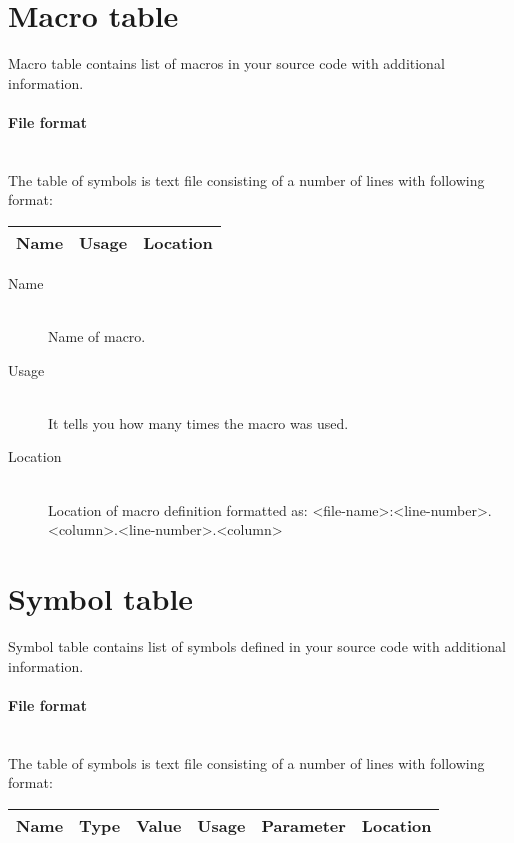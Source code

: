 \clearpage
\section{Macro table}
    Macro table contains list of macros in your source code with additional information.\\

    \paragraph{File format}
        ~\\
        The table of symbols is text file consisting of a number of lines with following format:\\
        \begin{tabular}{|ccc|}
            \hline
            Name & Usage & Location \\
            \hline
        \end{tabular}

    \begin{description}
        \item[Name]~\\
            Name of macro.
        \item[Usage]~\\
            It tells you how many times the macro was used.
        \item[Location]~\\
            Location of macro definition formatted as: <file-name>:<line-number>.<column>.<line-number>.<column>
    \end{description}

\section{Symbol table}
    Symbol table contains list of symbols defined in your source code with additional information.

    \paragraph{File format}
        ~\\
        The table of symbols is text file consisting of a number of lines with following format:\\
        \begin{tabular}{|cccccc|}
            \hline
            Name & Type & Value & Usage & Parameter & Location \\
            \hline
        \end{tabular}

